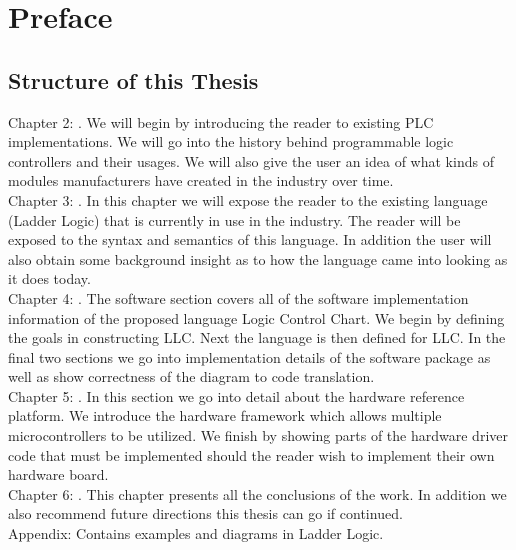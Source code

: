 
\chapter{Preface}

\section{Structure of this Thesis}

\noindent
Chapter 2: . We will begin by introducing the reader to existing PLC implementations. We will go into the history behind programmable logic controllers and their usages. We will also give the user an idea of what kinds of modules manufacturers have created in the industry over time.
\\

\noindent
Chapter 3: . In this chapter we will expose the reader to the existing language (Ladder Logic) that is currently in use in the industry. The reader will be exposed to the syntax and semantics of this language. In addition the user will also obtain some background insight as to how the language came into looking as it does today.
\\

\noindent
Chapter 4: . The software section covers all of the software implementation information of the proposed language Logic Control Chart. We begin by defining the goals in constructing LLC. Next the language is then defined for LLC. In the final two sections we go into implementation details of the software package as well as show correctness of the diagram to code translation.
\\

\noindent
Chapter 5: . In this section we go into detail about the hardware reference platform. We introduce the hardware framework which allows multiple microcontrollers to be utilized. We finish by showing parts of the hardware driver code that must be implemented should the reader wish to implement their own hardware board.
\\

\noindent
Chapter 6: . This chapter presents all the conclusions of the work. In addition we also recommend future directions this thesis can go if continued.
\\

\noindent
Appendix: Contains examples and diagrams in Ladder Logic.